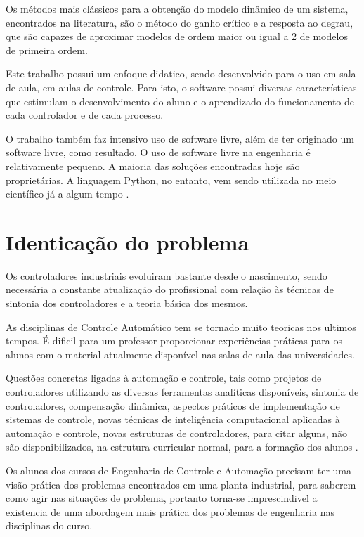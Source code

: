     Os métodos mais clássicos para a obtenção do modelo dinâmico de um sistema, encontrados
    na literatura, são o método do ganho crítico e a resposta ao degrau, que são capazes
    de aproximar modelos de ordem maior ou igual a 2 de modelos de primeira ordem.

    Este trabalho possui um enfoque didatico, sendo desenvolvido para o uso em sala de aula,
    em aulas de controle. Para isto, o software possui diversas características que estimulam
    o desenvolvimento do aluno e o aprendizado do funcionamento de cada controlador e 
    de cada processo.

    O trabalho também faz intensivo uso de software livre, além de ter originado um software
    livre, como resultado. O uso de software livre na engenharia é relativamente pequeno.
    A maioria das soluções encontradas hoje são proprietárias. A linguagem Python, no entanto,
    vem sendo utilizada no meio científico já a algum tempo \cite{5725235}.


\section{Identicação do problema}
    
    Os controladores industriais evoluiram bastante desde o nascimento, sendo necessária
    a constante atualização do profissional com relação às técnicas de sintonia dos
    controladores e a teoria básica dos mesmos.

    As disciplinas de Controle Automático tem se tornado muito teoricas nos ultimos
    tempos. É dificil para um professor proporcionar experiências práticas para os
    alunos com o material atualmente disponível nas salas de aula das universidades.
    
    Questões concretas ligadas à automação e controle, tais como projetos de
    controladores utilizando as diversas ferramentas analíticas disponíveis, sintonia de
    controladores, compensação dinâmica, aspectos práticos de implementação de sistemas de
    controle, novas técnicas de inteligência computacional aplicadas à automação e controle,
    novas estruturas de controladores, para citar alguns, não são disponibilizados, na estrutura
    curricular normal, para a formação dos alunos \cite{cobenge}.

    Os alunos dos cursos de Engenharia de Controle e Automação precisam ter uma
    visão prática dos problemas encontrados em uma planta industrial, para saberem
    como agir nas situações de problema, portanto torna-se imprescindivel a existencia
    de uma abordagem mais prática dos problemas de engenharia nas disciplinas do curso.

